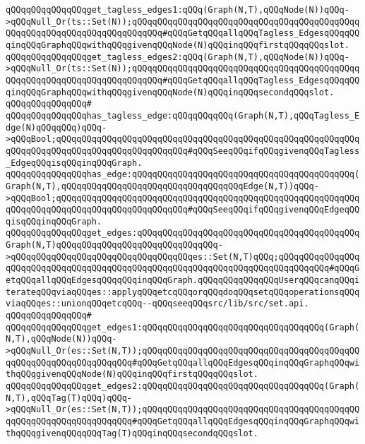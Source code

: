 \verb|qQQqqQQqqQQqqQQqget_tagless_edges1:qQQq(Graph(N,T),qQQqNode(N))qQQq->qQQqNull_Or(ts::Set(N));qQQqqQQqqQQqqQQqqQQqqQQqqQQqqQQqqQQqqQQqqQQqqQQqqQQqqQQqqQQqqQQqqQQqqQQqqQQq#qQQqGetqQQqallqQQqTagless_EdgesqQQqqQQqinqQQqGraphqQQqwithqQQqgivenqQQqNode(N)qQQqinqQQqfirstqQQqqQQqslot.|\newline
\verb|qQQqqQQqqQQqqQQqget_tagless_edges2:qQQq(Graph(N,T),qQQqNode(N))qQQq->qQQqNull_Or(ts::Set(N));qQQqqQQqqQQqqQQqqQQqqQQqqQQqqQQqqQQqqQQqqQQqqQQqqQQqqQQqqQQqqQQqqQQqqQQqqQQq#qQQqGetqQQqallqQQqTagless_EdgesqQQqqQQqinqQQqGraphqQQqwithqQQqgivenqQQqNode(N)qQQqinqQQqsecondqQQqslot.|\newline
\verb|qQQqqQQqqQQqqQQq#|\newline
\verb|qQQqqQQqqQQqqQQqhas_tagless_edge:qQQqqQQqqQQq(Graph(N,T),qQQqTagless_Edge(N)qQQqqQQq)qQQq->qQQqBool;qQQqqQQqqQQqqQQqqQQqqQQqqQQqqQQqqQQqqQQqqQQqqQQqqQQqqQQqqQQqqQQqqQQqqQQqqQQqqQQqqQQqqQQqqQQqqQQq#qQQqSeeqQQqifqQQqgivenqQQqTagless_EdgeqQQqisqQQqinqQQqGraph.|\newline
\verb|qQQqqQQqqQQqqQQqhas_edge:qQQqqQQqqQQqqQQqqQQqqQQqqQQqqQQqqQQqqQQqqQQq(Graph(N,T),qQQqqQQqqQQqqQQqqQQqqQQqqQQqqQQqqQQqEdge(N,T))qQQq->qQQqBool;qQQqqQQqqQQqqQQqqQQqqQQqqQQqqQQqqQQqqQQqqQQqqQQqqQQqqQQqqQQqqQQqqQQqqQQqqQQqqQQqqQQqqQQqqQQqqQQq#qQQqSeeqQQqifqQQqgivenqQQqEdgeqQQqisqQQqinqQQqGraph.|\newline
\newline
\verb|qQQqqQQqqQQqqQQqget_edges:qQQqqQQqqQQqqQQqqQQqqQQqqQQqqQQqqQQqqQQqqQQqGraph(N,T)qQQqqQQqqQQqqQQqqQQqqQQqqQQqqQQq->qQQqqQQqqQQqqQQqqQQqqQQqqQQqqQQqqQQqes::Set(N,T)qQQq;qQQqqQQqqQQqqQQqqQQqqQQqqQQqqQQqqQQqqQQqqQQqqQQqqQQqqQQqqQQqqQQqqQQqqQQqqQQqqQQq#qQQqGetqQQqallqQQqEdgesqQQqqQQqinqQQqGraph.qQQqqQQqqQQqqQQqUserqQQqcanqQQqiterateqQQqviaqQQqes::applyqQQqetcqQQqorqQQqdoqQQqsetqQQqoperationsqQQqviaqQQqes::unionqQQqetcqQQq--qQQqseeqQQqsrc/lib/src/set.api.|\newline
\verb|qQQqqQQqqQQqqQQq#|\newline
\verb|qQQqqQQqqQQqqQQqget_edges1:qQQqqQQqqQQqqQQqqQQqqQQqqQQqqQQqqQQq(Graph(N,T),qQQqNode(N))qQQq->qQQqNull_Or(es::Set(N,T));qQQqqQQqqQQqqQQqqQQqqQQqqQQqqQQqqQQqqQQqqQQqqQQqqQQqqQQqqQQqqQQqqQQq#qQQqGetqQQqallqQQqEdgesqQQqinqQQqGraphqQQqwithqQQqgivenqQQqNode(N)qQQqinqQQqfirstqQQqqQQqslot.|\newline
\verb|qQQqqQQqqQQqqQQqget_edges2:qQQqqQQqqQQqqQQqqQQqqQQqqQQqqQQqqQQq(Graph(N,T),qQQqTag(T)qQQq)qQQq->qQQqNull_Or(es::Set(N,T));qQQqqQQqqQQqqQQqqQQqqQQqqQQqqQQqqQQqqQQqqQQqqQQqqQQqqQQqqQQqqQQqqQQq#qQQqGetqQQqallqQQqEdgesqQQqinqQQqGraphqQQqwithqQQqgivenqQQqqQQqTag(T)qQQqinqQQqsecondqQQqslot.|\newline
